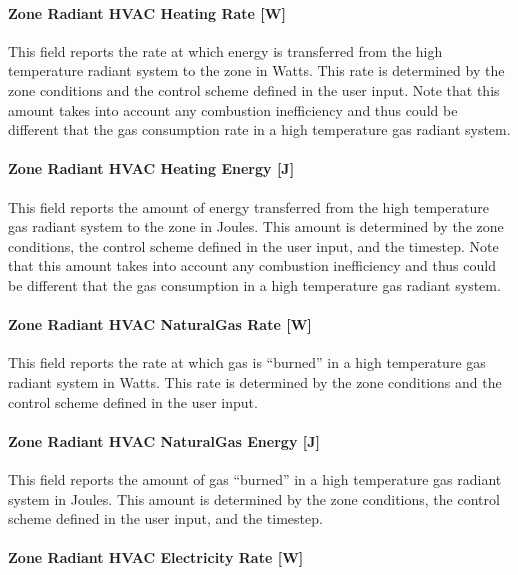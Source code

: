 \paragraph{Zone Radiant HVAC Heating Rate {[}W{]}}\label{zone-radiant-hvac-heating-rate-w-3}

This field reports the rate at which energy is transferred from the high temperature radiant system to the zone in Watts. This rate is determined by the zone conditions and the control scheme defined in the user input. Note that this amount takes into account any combustion inefficiency and thus could be different that the gas consumption rate in a high temperature gas radiant system.

\paragraph{Zone Radiant HVAC Heating Energy {[}J{]}}\label{zone-radiant-hvac-heating-energy-j-3}

This field reports the amount of energy transferred from the high temperature gas radiant system to the zone in Joules. This amount is determined by the zone conditions, the control scheme defined in the user input, and the timestep. Note that this amount takes into account any combustion inefficiency and thus could be different that the gas consumption in a high temperature gas radiant system.

\paragraph{Zone Radiant HVAC NaturalGas Rate {[}W{]}}\label{zone-radiant-hvac-gas-rate-w}

This field reports the rate at which gas is ``burned'' in a high temperature gas radiant system in Watts. This rate is determined by the zone conditions and the control scheme defined in the user input.

\paragraph{Zone Radiant HVAC NaturalGas Energy {[}J{]}}\label{zone-radiant-hvac-gas-energy-j}

This field reports the amount of gas ``burned'' in a high temperature gas radiant system in Joules. This amount is determined by the zone conditions, the control scheme defined in the user input, and the timestep.

\paragraph{Zone Radiant HVAC Electricity Rate {[}W{]}}\label{zone-radiant-hvac-electric-powerw}

